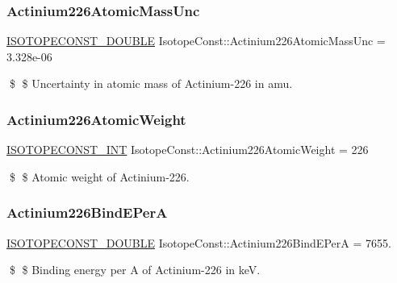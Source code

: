 \subsubsection{\texorpdfstring{Actinium226\+Atomic\+Mass\+Unc}{Actinium226AtomicMassUnc}}
{\footnotesize\ttfamily \mbox{\hyperlink{group___isotope_const-_macros_ga8f45a7272ce02c0b4c65c44636ed719a}{I\+S\+O\+T\+O\+P\+E\+C\+O\+N\+S\+T\+\_\+\+D\+O\+U\+B\+LE}} Isotope\+Const\+::\+Actinium226\+Atomic\+Mass\+Unc = 3.\+328e-\/06}

\$ \$ Uncertainty in atomic mass of Actinium-\/226 in amu. \mbox{\label{group___isotope_const-_actinium-_ac226_ga04703e52d8de132f9f24746cd6908f4f}} 
\subsubsection{\texorpdfstring{Actinium226\+Atomic\+Weight}{Actinium226AtomicWeight}}
{\footnotesize\ttfamily \mbox{\hyperlink{group___isotope_const-_macros_ga5f18360b3e99483a35c32d789e62621c}{I\+S\+O\+T\+O\+P\+E\+C\+O\+N\+S\+T\+\_\+\+I\+NT}} Isotope\+Const\+::\+Actinium226\+Atomic\+Weight = 226}

\$ \$ Atomic weight of Actinium-\/226. \mbox{\label{group___isotope_const-_actinium-_ac226_ga121b7a37ad8c0e67d444e400a47b3315}} 
\subsubsection{\texorpdfstring{Actinium226\+Bind\+E\+PerA}{Actinium226BindEPerA}}
{\footnotesize\ttfamily \mbox{\hyperlink{group___isotope_const-_macros_ga8f45a7272ce02c0b4c65c44636ed719a}{I\+S\+O\+T\+O\+P\+E\+C\+O\+N\+S\+T\+\_\+\+D\+O\+U\+B\+LE}} Isotope\+Const\+::\+Actinium226\+Bind\+E\+PerA = 7655.}

\$ \$ Binding energy per A of Actinium-\/226 in keV. \mbox{\label{group___isotope_const-_actinium-_ac226_gaa2b5ad8b5312561895a8f68837d8d03e}} 
